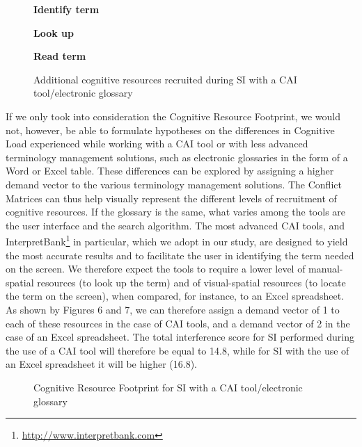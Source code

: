 \documentclass[output=paper]{langsci/langscibook}
\begin{document}
\begin{figure}
	\bfseries

		\textbf{Identify term}

		\textbf{Look up}
		
		\textbf{Read term}
\label{fig:prandi:4}\caption{Additional cognitive resources recruited during \textsc{SI} with a \textsc{CAI} tool/electronic glossary}
\end{figure}

If we only took into consideration the Cognitive Resource Footprint, we would not, however, be able to formulate hypotheses on the differences in Cognitive Load experienced while working with a \textsc{CAI} tool or with less advanced terminology management solutions, such as electronic glossaries in the form of a Word or Excel table. These differences can be explored by assigning a higher demand vector to the various terminology management solutions. The Conflict Matrices can thus help visually represent the different levels of recruitment of cognitive resources. If the glossary is the same, what varies among the tools are the user interface and the search algorithm. The most advanced \textsc{CAI} tools, and InterpretBank\footnote{\url{http://www.interpretbank.com}} in particular, which we adopt in our study, are designed to yield the most accurate results and to facilitate the user in identifying the term needed on the screen. We therefore expect the tools to require a lower level of manual-spatial resources (to look up the term) and of visual-spatial resources (to locate the term on the screen), when compared, for instance, to an Excel spreadsheet. As shown by Figures 6 and 7, we can therefore assign a demand vector of 1 to each of these resources in the case of \textsc{CAI} tools, and a demand vector of 2 in the case of an Excel spreadsheet. The total interference score for \textsc{SI} performed during the use of a \textsc{CAI} tool will therefore be equal to 14.8, while for \textsc{SI} with the use of an Excel spreadsheet it will be higher (16.8).

\begin{figure}
\caption{\label{fig:prandi:5}Cognitive Resource Footprint for \textsc{SI} with a \textsc{CAI} tool/electronic glossary}
\end{figure}
\end{document}
